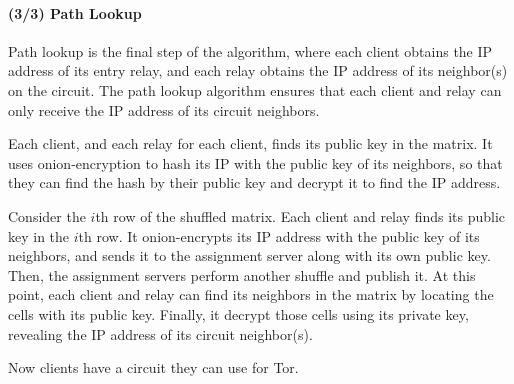 \paragraph{(3/3) Path Lookup}
Path lookup is the final step of the algorithm, where each client obtains the
IP address of its entry relay, and each relay obtains the IP address of its
neighbor(s) on the circuit. The path lookup algorithm ensures that each client
and relay can only receive the IP address of its circuit neighbors.

Each client, and each relay for each client, finds its public key in the matrix.
It uses onion-encryption to hash its IP with the public key of its neighbors,
so that they can find the hash by their public key and decrypt it to find the IP address. 

Consider the $i$th row of the shuffled matrix. Each client and relay finds its 
public key in the $i$th row. It onion-encrypts its IP address with the public
key of its neighbors, and sends it to the assignment server along with its own
public key. Then, the assignment servers perform another shuffle and publish it. At this point, each client and relay can find its neighbors in the matrix by
locating the cells with its public key. Finally, it decrypt those cells using its
private key, revealing the IP address of its circuit neighbor(s).

Now clients have a circuit they can use for Tor.

		



